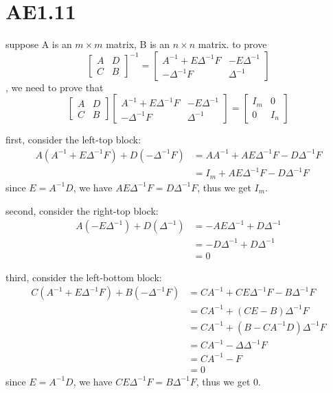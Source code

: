 \documentclass[12pt,a4paper]{article}
\begin{document}
\section{AE1.11}

suppose A is an $m \times m$ matrix, B is an $n \times n$ matrix.
to prove
\[
\begin{bmatrix}
    A & D \\
    C & B
\end{bmatrix}^{-1} = \begin{bmatrix}
    A^{-1}+E\Delta^{-1}F & -E\Delta^{-1} \\
    -\Delta^{-1}F & \Delta^{-1}
\end{bmatrix}
\], we need to prove that
\[
    \begin{bmatrix}
        A & D \\
        C & B
    \end{bmatrix} \begin{bmatrix}
        A^{-1}+E\Delta^{-1}F & -E\Delta^{-1} \\
        -\Delta^{-1}F & \Delta^{-1}
    \end{bmatrix} = \begin{bmatrix}
        I_m & 0 \\
        0 & I_n
    \end{bmatrix}
\]

first, consider the left-top block:
\[
    \begin{aligned}
        A(A^{-1}+E\Delta^{-1}F) + D(-\Delta^{-1}F) & = AA^{-1} + AE\Delta^{-1}F - D\Delta^{-1}F \\
                                                     & = I_m + AE\Delta^{-1}F - D\Delta^{-1}F
    \end{aligned}
\]
since $E = A^{-1}D$, we have $AE\Delta^{-1}F = D\Delta^{-1}F$, thus we get $I_m$.

second, consider the right-top block:
\[
    \begin{aligned}
        A(-E\Delta^{-1}) + D(\Delta^{-1}) & = -AE\Delta^{-1} + D\Delta^{-1} \\
                                          & = -D\Delta^{-1} + D\Delta^{-1} \\
                                          & = 0
    \end{aligned}
\]

third, consider the left-bottom block:
\[
    \begin{aligned}
        C(A^{-1}+E\Delta^{-1}F) + B(-\Delta^{-1}F) & = CA^{-1} + CE\Delta^{-1}F - B\Delta^{-1}F \\
                                                & = CA^{-1} + (CE - B)\Delta^{-1}F \\
                                                & = CA^{-1} + (B - CA^{-1}D)\Delta^{-1}F \\
                                                & = CA^{-1} - \Delta \Delta^{-1} F \\
                                                & = CA^{-1} - F \\
                                                & = 0
    \end{aligned}
\]
since $E = A^{-1}D$, we have $CE\Delta^{-1}F = B\Delta^{-1}F$, thus we get $0$.
\end{document}
